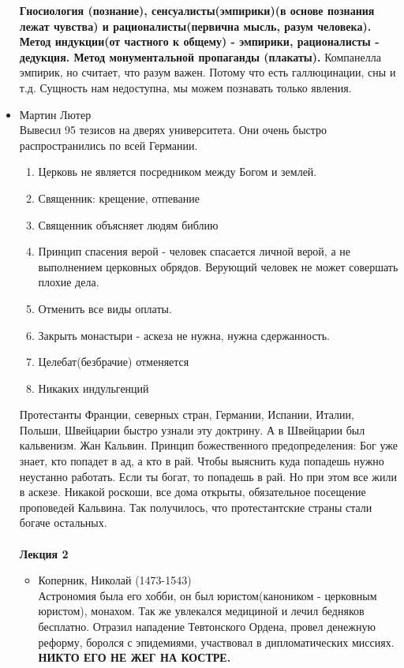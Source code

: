\documentclass[a4paper,12pt]{report} %
\begin{document}
\begin{itemize}
\textbf{Гносиология (познание), сенсуалисты(эмпирики)(в основе познания лежат чувства) и
рационалисты(первична мысль, разум человека). Метод индукции(от
частного к общему) - эмпирики, рационалисты - дедукция. Метод
монументальной пропаганды (плакаты).
}
Компанелла эмпирик, но считает, что разум важен. Потому что есть
галлюцинации, сны и т.д. Сущность нам недоступна, мы можем познавать
только явления.
\item Мартин Лютер \\
Вывесил 95 тезисов на дверях университета. Они очень быстро
распространились по всей Германии.\\
\begin{enumerate}
\item Церковь не является посредником между Богом и землей.
\item Священник: крещение, отпевание
\item Священник объясняет людям библию
\item Принцип спасения верой - человек спасается личной верой, а не
  выполнением церковных обрядов. Верующий человек не может совершать
  плохие дела.
\item Отменить все виды оплаты.
\item Закрыть монастыри - аскеза не нужна, нужна сдержанность.
\item Целебат(безбрачие) отменяется
\item Никаких индульгенций
\end{enumerate}
Протестанты Франции, северных стран, Германии, Испании, Италии,
Польши, Швейцарии быстро узнали эту доктрину. А в Швейцарии был
кальвенизм. Жан Кальвин. Принцип божественного предопределения: Бог уже
знает, кто попадет в ад, а кто в рай. Чтобы выяснить куда попадешь
нужно неустанно работать. Если ты богат, то попадешь в рай. Но при
этом все жили в аскезе. Никакой роскоши, все дома открыты,
обязательное посещение проповедей Кальвина. Так получилось, что
протестантские страны стали богаче остальных.\\
\\
\textbf{Лекция 2}\\
\begin{itemize}
\item Коперник, Николай (1473-1543)\\
Астрономия была его хобби, он был юристом(каноником - церковным
юристом), монахом. Так же увлекался медициной и лечил бедняков
бесплатно. Отразил нападение Тевтонского Ордена, провел денежную
реформу, боролся с эпидемиями, участвовал в дипломатических миссиях. \textbf{НИКТО ЕГО НЕ ЖЕГ НА КОСТРЕ.}\\

\end{itemize}
\end{itemize}
\end{document}
